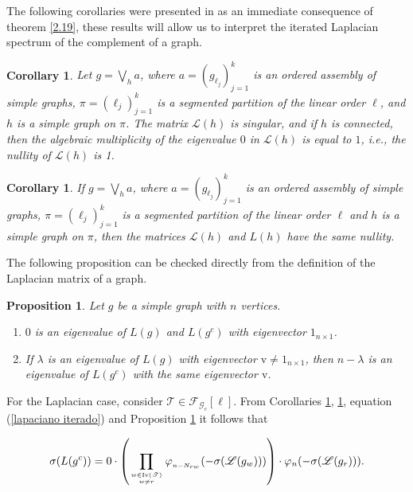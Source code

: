 \documentclass[11pt]{article}
\newtheorem{proposition}[theorem]{Proposition}
\newtheorem{corollary}[theorem]{Corollary}
\theoremstyle{definition}
\begin{document}
The following corollaries were presented in \cite{Cardoso2013} as an immediate consequence of theorem \ref{2.19}, these results will allow us to interpret the iterated Laplacian spectrum of the complement of a graph.

\begin{corollary}\label{nulidad laplaciana}
Let $g=\displaystyle{\bigvee_h a}$, where $a=(g_{\ell_j})^k_{j=1}$ is an ordered assembly of simple graphs, $\pi=(\ell_j)^k_{j=1}$ is a segmented partition of the linear order $\ell$, and $h$ is a simple graph on $\pi$. The matrix $\mathscr{L}(h)$ is singular, and if $h$ is connected, then the algebraic multiplicity of the eigenvalue $0$ in $\mathscr{L}(h)$ is equal to $1$, i.e., the nullity of $\mathscr{L}(h)$ is 1.
\end{corollary}

\begin{corollary}\label{nulidad grafo externo}
If $g=\displaystyle{\bigvee_h a}$, where $a=(g_{\ell_j})^k_{j=1}$ is an ordered assembly of simple graphs, $\pi=(\ell_j)^k_{j=1}$ is a segmented partition of the linear order $\ell$ and $h$ is a simple graph on $\pi$, then the matrices $\mathscr{L}(h)$ and $L(h)$ have the same nullity.
\end{corollary}

The following proposition can be checked directly from the definition of the Laplacian matrix of a graph.
\begin{proposition}\label{autovector principal}
    Let $g$ be a simple graph with $n$ vertices.
\begin{enumerate}
    \item $0$ is an eigenvalue of $L(g)$ and $L(g^c)$ with eigenvector $1_{n\times 1}$.
    \item If $\lambda$ is an eigenvalue of $L(g)$ with eigenvector $\mathrm{v}\neq 1_{n\times 1}$, then $n-\lambda$ is an eigenvalue of $L(g^c)$ with the same eigenvector $\mathrm{v}$.
\end{enumerate}
\end{proposition}

For the Laplacian case, consider $\mathscr{T}\in \mathscr{F}_{\mathscr{G}_c}[\ell]$. From Corollaries \ref{nulidad grafo externo}, \ref{nulidad laplaciana}, equation (\ref{lapaciano iterado}) and Proposition \ref{autovector principal} it follows that

\begin{equation}
    \sigma(L(g^c))=0\cdot \left(\prod_{w\in \mathrm{Iv}(\mathscr{T})\atop w\neq r}\varphi_{_{n-N_{rw}}}(-\sigma(\mathscr{L}(g_w)))\right)\cdot \varphi_n(-\sigma(\mathscr{L}(g_r))).
\end{equation}
\end{document}
